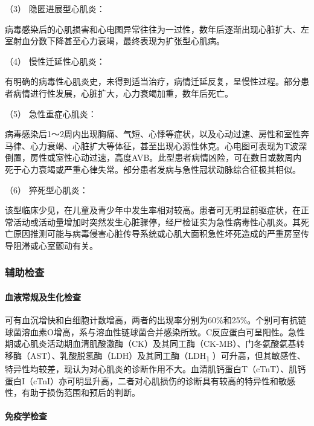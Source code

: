 \hypertarget{text00304.htmlux5cux23CHP10-5-2-1-2-3}{}
（3） 隐匿进展型心肌炎：

病毒感染后的心肌损害和心电图异常往往为一过性，数年后逐渐出现心脏扩大、左室射血分数下降甚至心力衰竭，最终表现为扩张型心肌病。

\hypertarget{text00304.htmlux5cux23CHP10-5-2-1-2-4}{}
（4） 慢性迁延性心肌炎：

有明确的病毒性心肌炎史，未得到适当治疗，病情迁延反复，呈慢性过程。部分患者病情进行性发展，心脏扩大，心力衰竭加重，数年后死亡。

\hypertarget{text00304.htmlux5cux23CHP10-5-2-1-2-5}{}
（5） 急性重症心肌炎：

病毒感染后1～2周内出现胸痛、气短、心悸等症状，以及心动过速、房性和室性奔马律、心力衰竭、心脏扩大等体征，甚至出现心源性休克。心电图可表现为T波深倒置，房性或室性心动过速，高度AVB。此型患者病情凶险，可在数日或数周内死于心力衰竭或严重心律失常。部分患者发病与急性冠状动脉综合征极其相似。

\hypertarget{text00304.htmlux5cux23CHP10-5-2-1-2-6}{}
（6） 猝死型心肌炎：

该型临床少见，在儿童及青少年中发生率相对较高。患者可无明显前驱症状，在正常活动或活动量增加时突然发生心脏骤停，经尸检证实为急性病毒性心肌炎。其死亡原因推测可能与病毒侵害心脏传导系统或心肌大面积急性坏死造成的严重房室传导阻滞或心室颤动有关。

\subsubsection{辅助检查}

\paragraph{血液常规及生化检查}

可有血沉增快和白细胞计数增高，两者的出现率分别为60\%和25\%。个别可有抗链球菌溶血素O增高，系与溶血性链球菌合并感染所致。C反应蛋白可呈阳性。急性期或心肌炎活动期血清肌酸激酶（CK）及其同工酶（CK-MB）、门冬氨酸氨基转移酶（AST）、乳酸脱氢酶（LDH）及其同工酶（LDH\textsubscript{1}
）可升高，但其敏感性、特异性均较差，现认为对心肌炎的诊断作用不大。血清肌钙蛋白T（cTnT）、肌钙蛋白I（cTnI）亦可明显升高，二者对心肌损伤的诊断具有较高的特异性和敏感性，有助于损伤范围和预后的判断。

\paragraph{免疫学检查}

